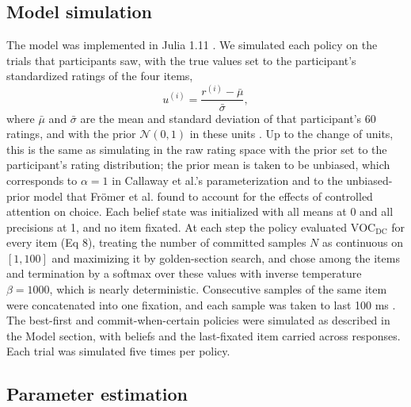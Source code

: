 \documentclass[10pt,letterpaper]{article}
\begin{document}
\subsection*{Model simulation}\label{model-simulation}

The model was implemented in Julia 1.11 \cite{bezanson2017}. We
simulated each policy on the trials that participants saw, with the true
values set to the participant's standardized ratings of the four items,
\begin{equation}
u^{(i)} = \frac{r^{(i)} - \bar{\mu}}{\bar{\sigma}}, 
\end{equation} where \(\bar{\mu}\) and \(\bar{\sigma}\) are the mean and
standard deviation of that participant's 60 ratings, and with the prior
\(\mathcal{N}(0, 1)\) in these units \cite{callaway2021}. Up to the
change of units, this is the same as simulating in the raw rating space
with the prior set to the participant's rating distribution; the prior
mean is taken to be unbiased, which corresponds to \(\alpha = 1\) in
Callaway et al.'s parameterization and to the unbiased-prior model that
Frömer et al. \cite{fromer2025} found to account for the effects of
controlled attention on choice. Each belief state was initialized with
all means at 0 and all precisions at 1, and no item fixated. At each
step the policy evaluated \(\text{VOC}_{\text{DC}}\) for every item (Eq
8), treating the number of committed samples \(N\) as continuous on
\([1, 100]\) and maximizing it by golden-section search, and chose among
the items and termination by a softmax over these values with inverse
temperature \(\beta = 1000\), which is nearly deterministic. Consecutive
samples of the same item were concatenated into one fixation, and each
sample was taken to last 100 ms \cite{callaway2021}. The best-first and
commit-when-certain policies were simulated as described in the Model
section, with beliefs and the last-fixated item carried across
responses. Each trial was simulated five times per policy.

\subsection*{Parameter estimation}\label{parameter-estimation}
\end{document}
